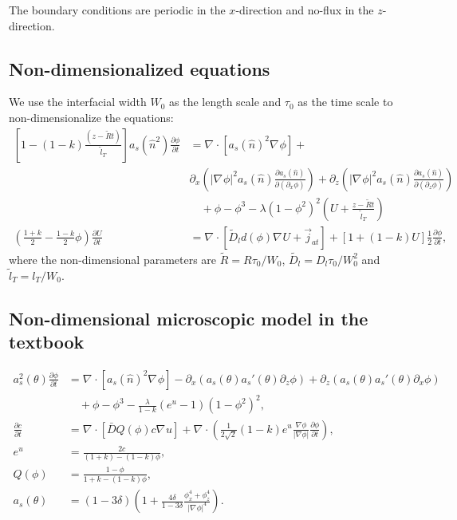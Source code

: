 \documentclass[a4paper,12pt]{article}
\renewcommand{\div}[1]{\nabla_{#1} \cdot}
\newcommand{\grad}[1]{\nabla_{#1}}
\begin{document}
The boundary conditions are periodic in the $x$-direction and no-flux in the $z$-direction.

\subsection{Non-dimensionalized equations}
We use  the interfacial width $W_0$ as the length scale and $\tau_0$ as the time scale to non-dimensionalize the equations:
\begin{align}
 \left[1-(1-k) \frac{(z- \tilde{R} t)}{ \tilde{l}_T} \right] a_s(\hat{n}^2) \frac{\partial \phi}{\partial t} &= 
  \div{} [a_s(\hat{n})^2 \grad{} \phi] + \nonumber  \\  
 & \partial_x \left( |\grad{} \phi|^2 a_s(\hat{n}) \frac{\partial a_s(\hat{n})}{\partial (\partial_x \phi)}  \right)  + 
\partial_z \left( |\grad{} \phi|^2 a_s(\hat{n}) \frac{\partial a_s(\hat{n})}{\partial (\partial_z \phi)}  \right)   \nonumber \\
& \quad + \phi - \phi^3 - \lambda (1-\phi^2)^2 \left(U + \frac{z-\tilde{R} t}{ \tilde{l}_T} \right) \\
\left(\frac{1+k}{2}-\frac{1-k}{2}\phi \right) \frac{\partial U}{\partial t} &= \div{} [\tilde{D}_l d(\phi) \grad{} U + \vec{j}_{at}] + [1+(1-k)U]\frac{1}{2}  \frac{\partial \phi}{\partial t},
\end{align}
where the non-dimensional parameters are  $\tilde{R} = R\tau_0 / W_0$, $\tilde{D_l} = D_l \tau_0 / W_0^2$ and $\tilde{l}_T = l_T / W_0$.

\subsection{Non-dimensional microscopic model in the textbook}
\begin{align}
 a_s^2(\theta) \frac{\partial \phi}{\partial t} &= \div{} [a_s(\hat{n})^2 \grad{} \phi] -  \partial_x \left( a_s(\theta) a_s'(\theta) \partial_z \phi   \right)  +
\partial_z \left( a_s(\theta) a_s'(\theta) \partial_x \phi \right)    \nonumber \\
& \quad + \phi - \phi^3 - \frac{\lambda}{1-k} (e^u-1) (1-\phi^2)^2 ,  \\
\frac{\partial c}{\partial t} &= \div{} [ \bar{D} Q(\phi) c \grad{} u ] + \div{} \left( \frac{1}{2\sqrt{2}} (1-k) e^u \frac{\nabla \phi}{|\nabla \phi|} \frac{\partial \phi}{\partial t}  \right) , \\
e^u &= \frac{2c}{ (1+k) - (1-k) \phi }, \\
Q(\phi) &= \frac{1-\phi}{1+k-(1-k )\phi}, \\
a_s(\theta) &= (1-3\delta) \left(    1 + \frac{4\delta}{1-3\delta}   \frac{\phi_x^4 + \phi_z^4}{|\grad{} \phi|^4} \right).
\end{align}
\end{document}
